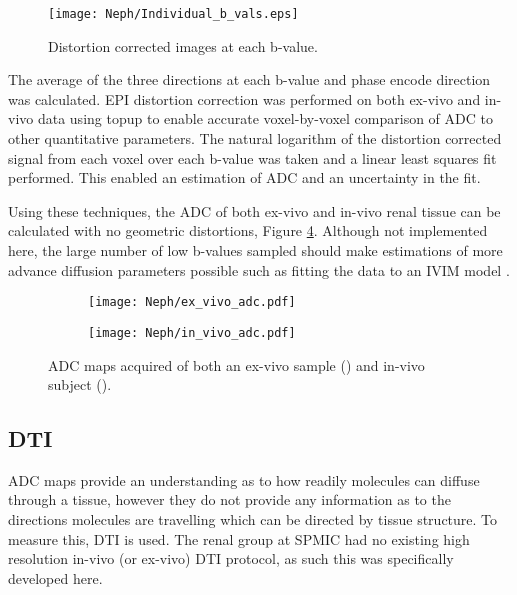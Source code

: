 \begin{figure}[H]
	\centering
	\texttt{[image: Neph/Individual\_b\_vals.eps]}
	\caption{Distortion corrected images at each b-value.}
	\label{fig:ex_adc_raw_data}	
\end{figure}

The average of the three directions at each b-value and phase encode direction was calculated. \ac{EPI} distortion correction was performed on both ex-vivo and in-vivo data using topup to enable accurate voxel-by-voxel comparison of \ac{ADC} to other quantitative parameters. The natural logarithm of the distortion corrected signal from each voxel over each b-value was taken and a linear least squares fit performed. This enabled an estimation of \ac{ADC} and an uncertainty in the fit. 

Using these techniques, the \ac{ADC} of both ex-vivo and in-vivo renal tissue can be calculated with no geometric distortions, Figure \ref{fig:ex_adc_maps}. Although not implemented here, the large number of low b-values sampled should make estimations of more advance diffusion parameters possible such as fitting the data to an \ac{IVIM} model \cite{le_bihan_separation_1988}.

\begin{figure}[H]
	\centering
	\begin{subfigure}[c]{0.47\textwidth}
		\centering
		\texttt{[image: Neph/ex\_vivo\_adc.pdf]}%
		\caption{}
		\label{fig:ex_adc_maps_ex_vivo}
	\end{subfigure}
	\hfill
	\begin{subfigure}[c]{0.47\textwidth}
		\centering
		\texttt{[image: Neph/in\_vivo\_adc.pdf]}%
		\caption{}
		\label{fig:ex_adc_maps_in_vivo}
	\end{subfigure}
	\caption{\ac{ADC} maps acquired of both an ex-vivo sample () and in-vivo subject ().}
	\label{fig:ex_adc_maps}
\end{figure}

\subsection{\acl*{DTI}}

\ac{ADC} maps provide an understanding as to how readily molecules can diffuse through a tissue, however they do not provide any information as to the directions molecules are travelling which can be directed by tissue structure. To measure this, \ac{DTI} is used. The renal group at \ac{SPMIC} had no existing high resolution in-vivo (or ex-vivo) \ac{DTI} protocol, as such this was specifically developed here.

